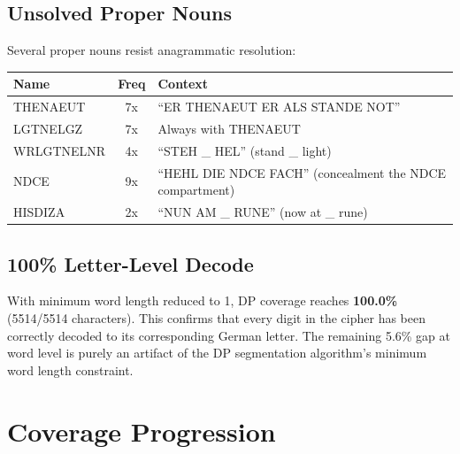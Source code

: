 \documentclass[11pt,a4paper]{article}
\begin{document}
\subsection{Unsolved Proper Nouns}

Several proper nouns resist anagrammatic resolution:

\begin{table}[h]
\centering
\begin{tabular}{lcl}
\toprule
Name & Freq & Context \\
\midrule
THENAEUT & 7x & ``ER THENAEUT ER ALS STANDE NOT'' \\
LGTNELGZ & 7x & Always with THENAEUT \\
WRLGTNELNR & 4x & ``STEH \_ HEL'' (stand \_ light) \\
NDCE & 9x & ``HEHL DIE NDCE FACH'' (concealment the NDCE compartment) \\
HISDIZA & 2x & ``NUN AM \_ RUNE'' (now at \_ rune) \\
\bottomrule
\end{tabular}
\end{table}

\subsection{100\% Letter-Level Decode}

With minimum word length reduced to 1, DP coverage reaches \textbf{100.0\%} (5514/5514 characters). This confirms that every digit in the cipher has been correctly decoded to its corresponding German letter. The remaining 5.6\% gap at word level is purely an artifact of the DP segmentation algorithm's minimum word length constraint.

\section{Coverage Progression}
\end{document}
